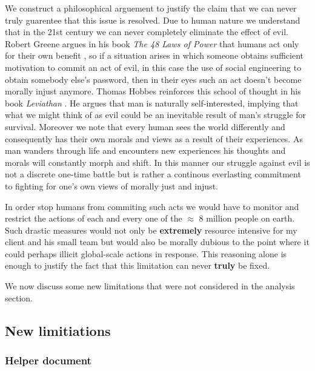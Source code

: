 We construct a philosophical arguement to justify the claim that we can never truly guarentee that this issue is
resolved. Due to human nature we understand that in the 21st century we can never completely eliminate the effect of
evil. Robert Greene argues in his book \textit{The 48 Laws of Power} that humans act only for their own benefit
\cite{power}, so if a situation arises in which someone obtains sufficient motivation to commit an act of evil,
in this case the use of social engineering to obtain somebody else's password, then in their eyes such an act doesn't
become morally injust anymore. Thomas Hobbes reinforces this school of thought in his book \textit{Leviathan} \cite{lev}.
He argues that man is naturally self-interested, implying that what we might think of as evil could be an inevitable
result of man's struggle for survival. Moreover we note that every human sees the world differently and consequently
has their own morals and views as a result of their experiences. As man wanders through life and encounters new
experiences his thoughts and morals will constantly morph and shift. In this manner our struggle against evil is not
a discrete one-time battle but is rather a continous everlasting commitment to fighting for one's own views of morally
just and injust.
\\ \vspace{0.2cm}

In order stop humans from commiting such acts we would have to monitor and restrict the actions of each and every one
of the $\approx$ 8 million people on earth. Such drastic measures would not only be \textbf{extremely} resource
intensive for my client and his small team but would also be morally dubious to the point where it could perhaps
illicit global-scale actions in response. This reasoning alone is enough to justify the fact that this limitation can
never \textbf{truly} be fixed. \\ \vspace{0.2cm}

We now discuss some new limitations that were not considered in the analysis section.

\subsection{New limitiations}

\subsubsection{Helper document}

